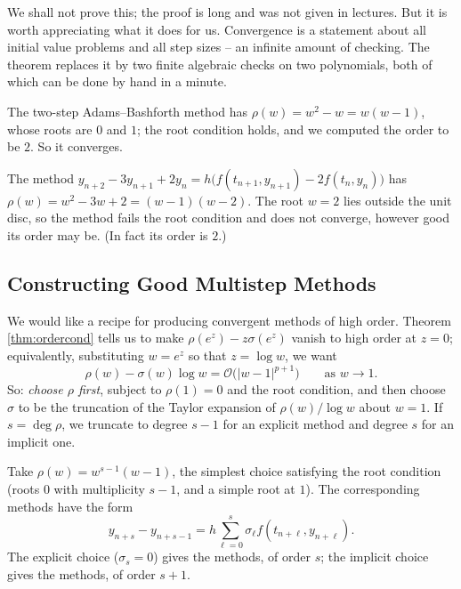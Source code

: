 \documentclass[a4paper]{scrartcl}
\providecommand{\abs}[1]{\left\lvert#1\right\rvert}
\renewcommand{\abs}[1]{\left\lvert#1\right\rvert}
\begin{document}
We shall not prove this; the proof is long and was not given in lectures. But it is worth appreciating what it does for us. Convergence is a statement about all initial value problems and all step sizes -- an infinite amount of checking. The theorem replaces it by two finite algebraic checks on two polynomials, both of which can be done by hand in a minute.

\begin{example}
  The two-step Adams--Bashforth method has $\rho(w) = w^2 - w = w(w-1)$, whose roots are $0$ and $1$; the root condition holds, and we computed the order to be $2$. So it converges.
\end{example}

\begin{example}
  The method $y_{n+2} - 3y_{n+1} + 2y_n = h\big(f(t_{n+1},y_{n+1}) - 2f(t_n,y_n)\big)$ has $\rho(w) = w^2 - 3w + 2 = (w-1)(w-2)$. The root $w = 2$ lies outside the unit disc, so the method fails the root condition and does not converge, however good its order may be. (In fact its order is $2$.)
\end{example}

\subsection{Constructing Good Multistep Methods}

We would like a recipe for producing convergent methods of high order. Theorem \ref{thm:ordercond} tells us to make $\rho(e^z) - z\sigma(e^z)$ vanish to high order at $z = 0$; equivalently, substituting $w = e^z$ so that $z = \log w$, we want
$$
\rho(w) - \sigma(w)\log w = \mathcal{O}\big(\abs{w-1}^{p+1}\big) \qquad \text{as } w \to 1.
$$
So: \emph{choose $\rho$ first}, subject to $\rho(1) = 0$ and the root condition, and then choose $\sigma$ to be the truncation of the Taylor expansion of $\rho(w)/\log w$ about $w = 1$. If $s = \deg\rho$, we truncate to degree $s-1$ for an explicit method and degree $s$ for an implicit one.

\begin{method}
  Take $\rho(w) = w^{s-1}(w-1)$, the simplest choice satisfying the root condition (roots $0$ with multiplicity $s-1$, and a simple root at $1$). The corresponding methods have the form
  $$
  y_{n+s} - y_{n+s-1} = h\sum_{\ell = 0}^{s}\sigma_\ell f(t_{n+\ell}, y_{n+\ell}).
  $$
  The explicit choice ($\sigma_s = 0$) gives the  methods, of order $s$; the implicit choice gives the  methods, of order $s+1$.
\end{method}
\end{document}
